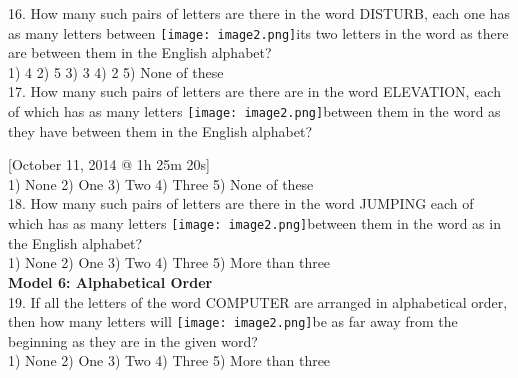 \documentclass[
]{article}
\begin{document}
16. How many such pairs of letters are there in the word DISTURB, each one has as many
letters between \texttt{[image: image2.png]}its two letters in the word as there are between them in the English
alphabet?\\
1) 4 \hspace{2mm}2) 5 \hspace{2mm}3) 3 \hspace{2mm}4) 2 \hspace{2mm}5) None of these\\

17. How many such pairs of letters are there are in the word ELEVATION, each of which has as
many letters \texttt{[image: image2.png]}between them in the word as they have between them in the English alphabet?

[October 11, 2014 @ 1h 25m 20s]\\
1) None \hspace{2mm}2) One \hspace{2mm}3) Two \hspace{2mm}4) Three \hspace{2mm}5) None of these\\

18. How many such pairs of letters are there in the word JUMPING each of which has as many
letters \texttt{[image: image2.png]}between them in the word as in the English alphabet?\\
1) None \hspace{2mm}2) One \hspace{2mm}3) Two \hspace{2mm}4) Three \hspace{2mm}5) More than three\\

\textbf{Model 6: Alphabetical Order}\\

19. If all the letters of the word COMPUTER are arranged in alphabetical order, then how many
letters will \texttt{[image: image2.png]}be as far away from the beginning as they are in the given word?\\
1) None \hspace{2mm}2) One \hspace{2mm}3) Two \hspace{2mm}4) Three \hspace{2mm}5) More than three\\
\end{document}
